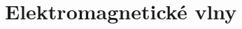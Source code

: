 \documentclass[a4paper, oneside, 11pt]{book}
\begin{document}
%
%
%
%
\renewcommand\thepage{}


\renewcommand\thepage{\arabic{page}}
\setcounter{page}{1}

%

%

%

\chapter{Elektromagnetické vlny} \label{kap:Evlny}


%

%
%
%

%


\appendix
%
%
%
%
\end{document}
